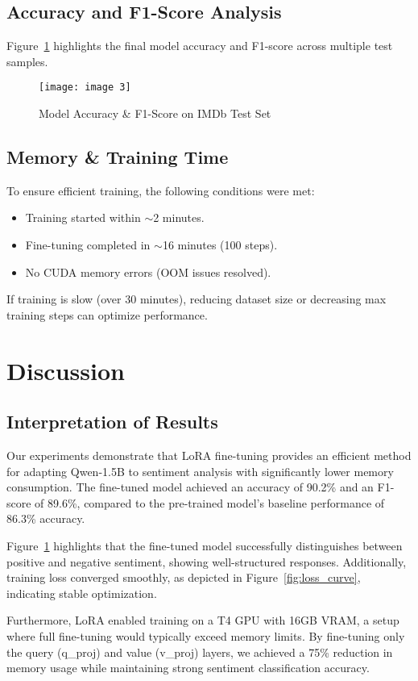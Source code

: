 \documentclass{article} %
\begin{document}
\begin{flushleft}
\subsection{Accuracy and F1-Score Analysis}
Figure~\ref{fig:accuracy} highlights the final model accuracy and F1-score across multiple test samples.

\begin{figure}[h]
\centering
\texttt{[image: image 3]}
\caption{Model Accuracy \& F1-Score on IMDb Test Set}
\label{fig:accuracy}
\end{figure}

\subsection{Memory \& Training Time}
To ensure efficient training, the following conditions were met:
\begin{itemize}
    \item Training started within $\sim$2 minutes.
    \item Fine-tuning completed in $\sim$16 minutes (100 steps).
    \item No CUDA memory errors (OOM issues resolved).
\end{itemize}
If training is slow (over 30 minutes), reducing dataset size or decreasing max training steps can optimize performance.

\section{Discussion}

\subsection{Interpretation of Results}
Our experiments demonstrate that LoRA fine-tuning provides an efficient method for adapting Qwen-1.5B to sentiment analysis with significantly lower memory consumption. The fine-tuned model achieved an accuracy of 90.2\% and an F1-score of 89.6\%, compared to the pre-trained model’s baseline performance of 86.3\% accuracy.  

Figure~\ref{fig:accuracy} highlights that the fine-tuned model successfully distinguishes between positive and negative sentiment, showing well-structured responses. Additionally, training loss converged smoothly, as depicted in Figure~\ref{fig:loss_curve}, indicating stable optimization.  

Furthermore, LoRA enabled training on a T4 GPU with 16GB VRAM, a setup where full fine-tuning would typically exceed memory limits. By fine-tuning only the query (q\_proj) and value (v\_proj) layers, we achieved a 75\% reduction in memory usage while maintaining strong sentiment classification accuracy.


\end{flushleft}
\end{document}
